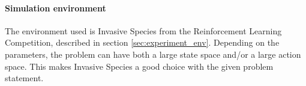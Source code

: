 \paragraph{Simulation environment}
\label{sec:env_used}
The environment used is Invasive Species from the Reinforcement Learning Competition, described in section \ref{sec:experiment_env}. Depending on the parameters, the problem can have both a large state space and/or a large action space. This makes Invasive Species a good choice with the given problem statement.

